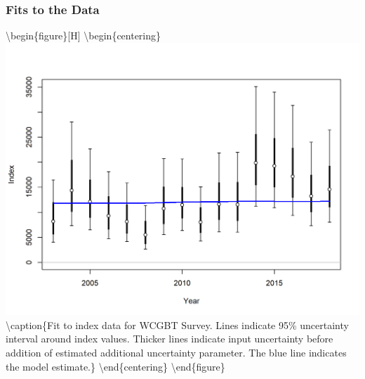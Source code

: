 \documentclass[12pt,]{article}
\begin{document}
\FloatBarrier

\hypertarget{fits-to-the-data-1}{%
\subsubsection{Fits to the Data}\label{fits-to-the-data-1}}

\FloatBarrier

\textbackslash{}begin\{figure\}{[}H{]}
\textbackslash{}begin\{centering\}
\includegraphics{r4ss/plots_mod1/index2_cpuefit_WCGBT Survey.png}
\textbackslash{}caption\{Fit to index data for WCGBT Survey. Lines
indicate 95\% uncertainty interval around index values. Thicker lines
indicate input uncertainty before addition of estimated additional
uncertainty parameter. The blue line indicates the model
estimate.\}\label{fig:index2_cpuefit_WCGBTS}
\textbackslash{}end\{centering\} \textbackslash{}end\{figure\}

\newpage
\end{document}
